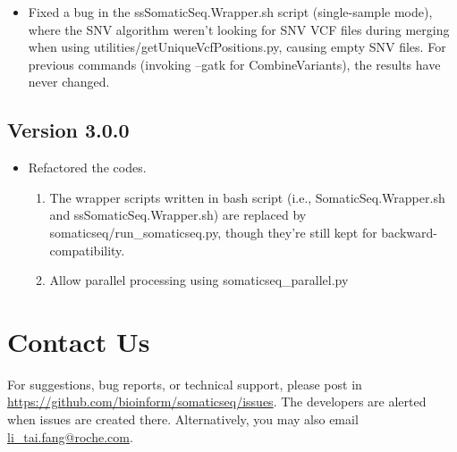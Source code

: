 \documentclass[10pt,letterpaper]{article}
\begin{document}
\begin{sloppypar}
\begin{itemize}

  \item
  Fixed a bug in the ssSomaticSeq.Wrapper.sh script (single-sample mode), where the SNV algorithm weren't looking for SNV VCF files during merging when using utilities/getUniqueVcfPositions.py, causing empty SNV files. For previous commands (invoking --gatk for CombineVariants), the results have never changed. 
  
\end{itemize}



\subsection{Version 3.0.0}

\begin{itemize}

  \item
  Refactored the codes.
  
    \begin{enumerate}

     \item The wrapper scripts written in bash script (i.e., SomaticSeq.Wrapper.sh and ssSomaticSeq.Wrapper.sh) are replaced by somaticseq/run\_somaticseq.py, though they're still kept for backward-compatibility. 
     
     \item Allow parallel processing using somaticseq\_parallel.py

    \end{enumerate}

  
  
  
\end{itemize}



\section{Contact Us}
For suggestions, bug reports, or technical support, please post in \href{https://github.com/bioinform/somaticseq/issues}{https://github.com/bioinform/somaticseq/issues}. The developers are alerted when issues are created there. Alternatively, you may also email \href{mailto:li_tai.fang@roche.com}{li\_tai.fang@roche.com}. 

\end{sloppypar}
\end{document}
